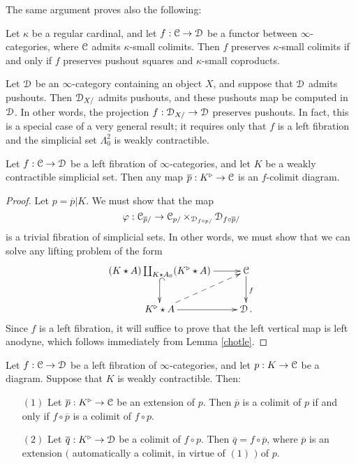 The same argument proves also the following:

\begin{proposition}\label{allimits}
Let $\kappa$ be a regular cardinal, and let $f: \operatorname{\mathcal{C}} \rightarrow \operatorname{\mathcal{D}}$ be a functor between $\infty$-categories, where $\operatorname{\mathcal{C}}$ admits $\kappa$-small colimits. Then
$f$ preserves $\kappa$-small colimits if and only if $f$ preserves pushout squares
and $\kappa$-small coproducts.
\end{proposition}

Let $\operatorname{\mathcal{D}}$ be an $\infty$-category containing an object $X$, and suppose that $\operatorname{\mathcal{D}}$
admits pushouts. Then $\operatorname{\mathcal{D}}_{X/}$ admits pushouts, and these pushouts map be computed in $\operatorname{\mathcal{D}}$. In other words, the projection $f: \operatorname{\mathcal{D}}_{X/} \rightarrow \operatorname{\mathcal{D}}$ preserves pushouts. In fact, this is a special case of a very general result; it requires only that $f$ is a left fibration and the
simplicial set $\Lambda^2_0$ is weakly contractible.

\begin{lemma}\label{pregoes}
Let $f: \operatorname{\mathcal{C}} \rightarrow \operatorname{\mathcal{D}}$ be a left fibration of $\infty$-categories, and let
$K$ be a weakly contractible simplicial set. Then any map
$\overline{p}: K^{\triangleright} \rightarrow \operatorname{\mathcal{C}}$ is an $f$-colimit diagram.
\end{lemma}

\begin{proof}
Let $p = \overline{p} | K$. We must show that the map
$$\varphi:  \operatorname{\mathcal{C}}_{\overline{p} /} \rightarrow \operatorname{\mathcal{C}}_{p/} \times_{\operatorname{\mathcal{D}}_{f \circ p/}} \operatorname{\mathcal{D}}_{f \circ \overline{p}/}$$ is a trivial fibration of simplicial sets. In other words, we must show that
we can solve any lifting problem of the form
$$ \xymatrix{ (K \star A) \coprod_{ K \star A_0} (K^{\triangleright} \star A) \ar[r] \ar@{^{(}->}[d] & \calC \ar[d]^{f} \\
K^{\triangleright} \star A \ar[r] \ar@{-->}[ur] & \calD. }$$
Since $f$ is a left fibration, it will suffice to prove that the left vertical map is left anodyne, which follows immediately from Lemma \ref{chotle}. 
\end{proof}

\begin{proposition}\label{goeselse}
Let $f: \operatorname{\mathcal{C}} \rightarrow \operatorname{\mathcal{D}}$ be a left fibration of $\infty$-categories, and let
$p: K \rightarrow \operatorname{\mathcal{C}}$ be a diagram. Suppose that
$K$ is weakly contractible. Then:
\begin{itemize}
\item[$(1)$] Let $\overline{p}: K^{\triangleright} \rightarrow \operatorname{\mathcal{C}}$ be an extension of $p$.
Then $\overline{p}$ is a colimit of $p$ if and only if $f \circ \overline{p}$ is a colimit of $f \circ p$.

\item[$(2)$] Let $\overline{q}: K^{\triangleright} \rightarrow \operatorname{\mathcal{D}}$ be a colimit of $f \circ p$.
Then $\overline{q} = f \circ \overline{p}$, where $\overline{p}$ is an extension $($ automatically a colimit, in virtue of $(1)$ $)$ of $p$.
\end{itemize}
\end{proposition}

